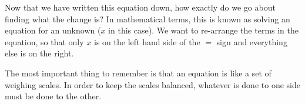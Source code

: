       \label{m38346*uid36}\nopagebreak\noindent{}
      \label{m38346*id176098}Now that we have written this equation down, how exactly do we go about finding
what the change is? In mathematical terms, this is known as solving an equation
for an unknown ($x$ in this case). We want to re-arrange the terms in the
equation, so that only $x$ is on the left hand side of the $=$ sign and
everything else is on the right.\par 
      \label{m38346*id176132}The most important thing to remember is that an equation is like a set of
weighing scales. In order to keep the scales balanced, whatever is done to one
side must be done to the other.\par 
    \setcounter{subfigure}{0}
